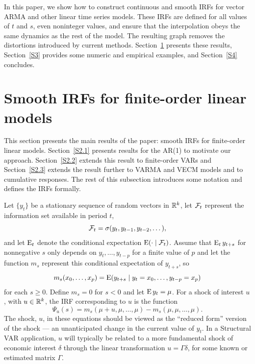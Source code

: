\documentclass[12pt,fleqn]{article}
\begin{document}
In this paper, we show how to construct continuous and smooth IRFs
for vector ARMA and other linear time series models. These IRFs are
defined for all values of $t$ and $s$, even noninteger values, and
ensure that the interpolation obeys the same dynamics as the rest of
the model. The resulting graph removes the distortions introduced by
current methods.  Section~\ref{S2} presents these results,
Section~\ref{S3} provides some numeric and empirical examples, and
Section~\ref{S4} concludes.

\section{Smooth IRFs for finite-order linear models}
\label{S2}

This section presents the main results of the paper: smooth IRFs for
finite-order linear models. Section~\ref{S2.1} presents results for
the AR(1) to motivate our approach. Section~\ref{S2.2} extends this
result to finite-order VARs and Section~\ref{S2.3} extends the
result further to VARMA and VECM models and to cumulative responses.
The rest of this subsection introduces some notation and defines the
IRFs formally.

Let $\{y_t\}$ be a stationary sequence of random vectors in $\mathbb{R}^k$,
let $\mathcal{F}_t$ represent the information set available in period $t$,
\begin{equation*}
  \mathcal{F}_t = \sigma(y_t, y_{t-1}, y_{t-2},\dots),
\end{equation*}
and let $\operatorname{E}_t$ denote the conditional expectation
$\operatorname{E}(\cdot \mid \mathcal{F}_t)$. Assume that $\operatorname{E}_t y_{t+s}$ for
nonnegative $s$ only depends on $y_t,\dots,y_{t-p}$ for a finite value
of $p$ and let the function $m_s$ represent this conditional
expectation of $y_{t+s}$, so
\begin{equation*}
  m_s(x_0,\dots,x_p)
  = \operatorname{E}(y_{t+s} \mid y_t = x_0,\dots, y_{t-p} = x_p)
\end{equation*}
for each $s \geq 0$. Define $m_s = 0$ for $s < 0$ and let
$\operatorname{E} y_t = \mu$. For a shock of interest $u$, with $u \in \mathbb{R}^k$, the
IRF corresponding to $u$ is the function
\[
  \Psi_u(s) =
  m_s(\mu + u, \mu, \dots, \mu) - m_s(\mu, \mu, \dots,\mu).
\]
The shock, $u$, in these equations should be viewed as the ``reduced
form'' version of the shock --- an unanticipated change in the current
value of $y_t$. In a Structural VAR application, $u$ will typically
be related to a more fundamental shock of economic interest $\delta$
through the linear transformation $u = \Gamma \delta$, for some known
or estimated matrix $\Gamma$.
\end{document}
